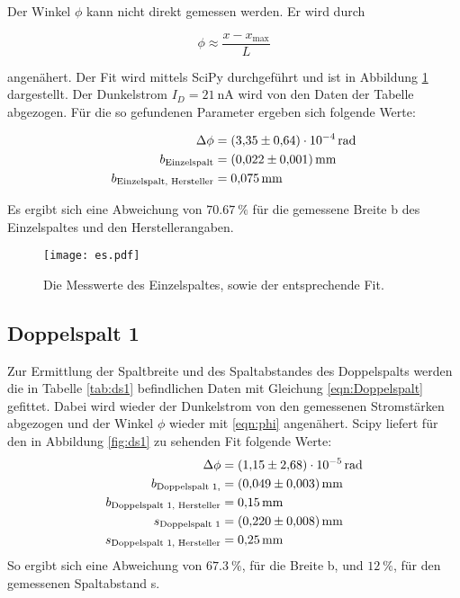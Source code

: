 Der Winkel $\phi$ kann nicht direkt gemessen werden.
Er wird durch

\begin{equation}
  \phi \approx \frac{x - x_{\text{max}}}{L}
  \label{eqn:phi}
\end{equation}

angenähert.
Der Fit wird mittels SciPy \cite{scipy} durchgeführt und ist in Abbildung \ref{fig:Einzelspalt} dargestellt.
Der Dunkelstrom $I_D = \SI{21}{\nano\ampere}$ wird von den Daten der Tabelle abgezogen.
Für die so gefundenen Parameter ergeben sich folgende Werte:

\begin{align*}
  \Delta \phi &= \SI{3.35 \pm 0.64e-4}{\radian} \\
  b_{\text{Einzelspalt}} &= \SI{0.022 \pm 0.001}{\milli\metre} \\
  b_{\text{Einzelspalt, Hersteller}} &= \SI{0.075}{\milli\metre}
\end{align*}

Es ergibt sich eine Abweichung von $\SI{70.67}{\percent}$ für die gemessene Breite b des Einzelspaltes und den Herstellerangaben.

\begin{figure}
  \centering
  \texttt{[image: es.pdf]}
  \caption{Die Messwerte des Einzelspaltes, sowie der entsprechende Fit.}
  \label{fig:Einzelspalt}
\end{figure}
\FloatBarrier
\subsection{Doppelspalt 1}
\FloatBarrier
\label{sec:ds1}
Zur Ermittlung der Spaltbreite und des Spaltabstandes des Doppelspalts werden die in Tabelle \ref{tab:ds1} befindlichen Daten mit Gleichung \eqref{eqn:Doppelspalt} gefittet.
Dabei wird wieder der Dunkelstrom von den gemessenen Stromstärken abgezogen und der Winkel $\phi$ wieder mit \eqref{eqn:phi} angenähert.
Scipy \cite{scipy} liefert für den in Abbildung \ref{fig:ds1} zu sehenden Fit folgende Werte:
\begin{align*}
  \Delta \phi &= \SI{1.15 \pm 2.68e-5}{\radian} \\
  b_{\text{Doppelspalt 1}, } &= \SI{0.049 \pm 0.003}{\milli\metre} \\
  b_{\text{Doppelspalt 1, Hersteller}} &= \SI{0.15}{\milli\metre} \\
  s_{\text{Doppelspalt 1}} &= \SI{0.220 \pm 0.008}{\milli\metre} \\
  s_{\text{Doppelspalt 1, Hersteller}} &= \SI{0.25}{\milli\metre}
\end{align*}
So ergibt sich eine Abweichung von $\SI{67.3}{\percent}$, für die Breite b, und $\SI{12}{\percent}$, für den gemessenen Spaltabstand s.

